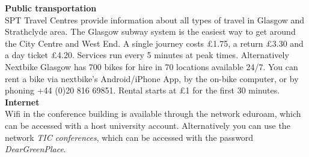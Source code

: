 \textbf{\Large Public transportation}\\

SPT Travel Centres provide information about all types of travel in Glasgow and Strathclyde area. The Glasgow subway system is the easiest way to get around the City Centre and West End. A single journey costs £1.75, a return £3.30 and a day ticket £4.20. Services run every 5 minutes at peak times. Alternatively Nextbike Glasgow has 700 bikes for hire in 70 locations available 24/7. You can rent a bike via nextbike's Android/iPhone App, by the on-bike computer, or by phoning +44 (0)20 816 69851. Rental starts at £1 for the first 30 minutes.\\[.2cm]

\textbf{\Large Internet}\\

Wifi in the conference building is available through the network eduroam, which can be accessed with a host university account. Alternatively you can use the network \textit{TIC conferences}, which can be accessed with the password \textit{DearGreenPlace}. \\
